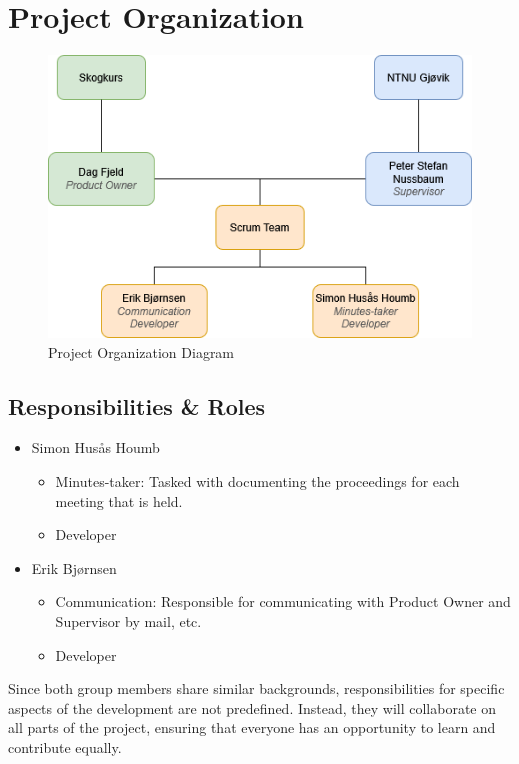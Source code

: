 \section{Project Organization}

\begin{figure}[H]
    \centering
    \includegraphics[width=0.75\linewidth]{Images/project_organization.png}
    \caption{Project Organization Diagram}
    \label{fig:prj_org}
\end{figure}

\subsection{Responsibilities \& Roles}\label{sec:responsibilities_roles}

\begin{itemize}
    \item Simon Husås Houmb
    \begin{itemize}
        \item Minutes-taker: Tasked with documenting the proceedings for each meeting that is held.
        \item Developer
    \end{itemize}
    \item Erik Bjørnsen
    \begin{itemize}
        \item Communication: Responsible for communicating with Product Owner and Supervisor by mail, etc.
        \item Developer
    \end{itemize}
\end{itemize}

Since both group members share similar backgrounds, responsibilities for specific aspects of the development are not predefined. Instead, they will collaborate on all parts of the project, ensuring that everyone has an opportunity to learn and contribute equally.

